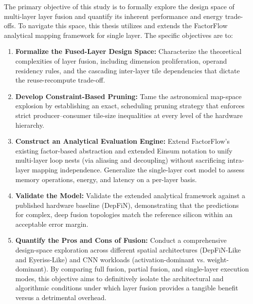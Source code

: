 The primary objective of this study is to formally explore the design space
of multi-layer layer fusion and quantify its inherent performance and energy
trade-offs. To navigate this space, this thesis utilizes and extends
the FactorFlow analytical mapping framework for single layer. The specific objectives are to:
%
\begin{enumerate}
  \item \textbf{Formalize the Fused-Layer Design Space:} Characterize the
        theoretical complexities of layer fusion, including dimension proliferation,
        operand residency rules, and the cascading inter-layer tile dependencies
        that dictate the reuse-recompute trade-off.

  \item \textbf{Develop Constraint-Based Pruning:} Tame the astronomical
        map-space explosion by establishing an exact, scheduling pruning
        strategy that enforces strict producer--consumer tile-size inequalities at
        every level of the hardware hierarchy.

  \item \textbf{Construct an Analytical Evaluation Engine:} Extend FactorFlow's
        existing factor-based abstraction and extended Einsum notation to unify
        multi-layer loop nests (via aliasing and decoupling) without sacrificing
        intra-layer mapping independence. Generalize the single-layer cost model to assess
        memory operations, energy, and latency on a per-layer basis.

  \item \textbf{Validate the Model:} Validate the extended analytical framework
        against a published hardware baseline (DepFiN), demonstrating that the
        predictions for complex, deep fusion topologies match the reference
        silicon within an acceptable error margin.

  \item \textbf{Quantify the Pros and Cons of Fusion:} Conduct a comprehensive
        design-space exploration across different spatial architectures (DepFiN-Like
        and Eyeriss-Like) and CNN workloads (activation-dominant vs. weight-dominant).
        By comparing full fusion, partial fusion, and single-layer execution modes,
        this objective aims to definitively isolate the architectural and algorithmic
        conditions under which layer fusion provides a tangible benefit versus
        a detrimental overhead.
\end{enumerate}

